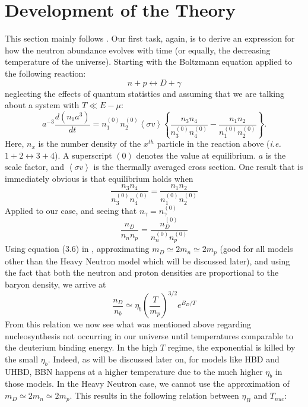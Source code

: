 \documentclass[aps,reprint,prl]{revtex4-1}
\begin{document}
\section*{Development of the Theory}
This section mainly follows \cite{Dodelson,NIU}.  Our first task, again, is to derive an expression for how the neutron abundance evolves with time (or equally, the decreasing temperature of the universe).  Starting with the Boltzmann equation applied to the following reaction:
\begin{equation*}
n+p\leftrightarrow D+\gamma
\end{equation*}
neglecting the effects of quantum statistics and assuming that we are talking about a system with $T\ll E-\mu$:
\begin{equation} \label{eq:boltzmann}
a^{-3}\frac{d\left(n_1a^3\right)}{dt}=n_1^{(0)}n_2^{(0)}\left<\sigma v\right>\left\{\frac{n_3n_4}{n_3^{(0)}n_4^{(0)}}-\frac{n_1n_2}{n_1^{(0)}n_2^{(0)}}\right\} .
\end{equation}
Here, $n_x$ is the number density of the $x^{th}$ particle in the reaction above (\emph{i.e.} $1+2\leftrightarrow 3+4$).  A superscript $(0)$ denotes the value at equilibrium.  $a$ is the scale factor, and $\left<\sigma v\right>$ is the thermally averaged cross section.  One result that is immediately obvious is that equilibrium holds when
\begin{equation}
\frac{n_3n_4}{n_3^{(0)}n_4^{(0)}}=\frac{n_1n_2}{n_1^{(0)}n_2^{(0)}}
\end{equation}
Applied to our case, and seeing that $n_\gamma=n_\gamma^{(0)}$
\begin{equation}
\frac{n_D}{n_n n_p}=\frac{n_D^{(0)}}{n_n^{(0)}n_p^{(0)}}
\end{equation}
Using equation (3.6) in \cite{Dodelson}, approximating $m_D\simeq2m_n\simeq2m_p$ (good for all models other than the Heavy Neutron model which will be discussed later), and using the fact that both the neutron and proton densities are proportional to the baryon density, we arrive at
\begin{equation} \label{eq:dodelson317}
\frac{n_D}{n_b}\simeq\eta_b\left(\frac{T}{m_p}\right)^{3/2}e^{B_D/T}
\end{equation}
From this relation we now see what was mentioned above regarding nucleosynthesis not occurring in our universe until temperatures comparable to the deuterium binding energy.  In the high $T$ regime, the exponential is killed by the small $\eta_b$.  Indeed, as will be discussed later on, for models like HBD and UHBD, BBN happens at a higher temperature due to the much higher $\eta_b$ in those models.  In the Heavy Neutron case, we cannot use the approximation of $m_D\simeq2m_n\simeq2m_p$.  This results in the following relation between $\eta_B$ and $T_{nuc}$:
\end{document}
